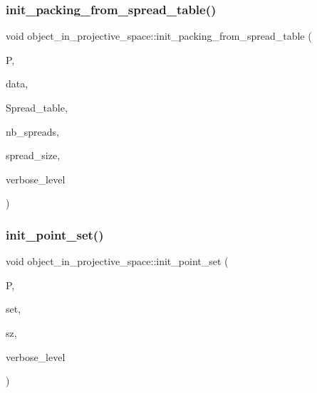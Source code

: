 \subsubsection{\texorpdfstring{init\+\_\+packing\+\_\+from\+\_\+spread\+\_\+table()}{init\_packing\_from\_spread\_table()}}
{\footnotesize\ttfamily void object\+\_\+in\+\_\+projective\+\_\+space\+::init\+\_\+packing\+\_\+from\+\_\+spread\+\_\+table (\begin{DoxyParamCaption}\item[{\mbox{\hyperlink{classprojective__space}{projective\+\_\+space}} $\ast$}]{P,  }\item[{\mbox{\hyperlink{galois_8h_a09fddde158a3a20bd2dcadb609de11dc}{I\+NT}} $\ast$}]{data,  }\item[{\mbox{\hyperlink{galois_8h_a09fddde158a3a20bd2dcadb609de11dc}{I\+NT}} $\ast$}]{Spread\+\_\+table,  }\item[{\mbox{\hyperlink{galois_8h_a09fddde158a3a20bd2dcadb609de11dc}{I\+NT}}}]{nb\+\_\+spreads,  }\item[{\mbox{\hyperlink{galois_8h_a09fddde158a3a20bd2dcadb609de11dc}{I\+NT}}}]{spread\+\_\+size,  }\item[{\mbox{\hyperlink{galois_8h_a09fddde158a3a20bd2dcadb609de11dc}{I\+NT}}}]{verbose\+\_\+level }\end{DoxyParamCaption})}

\mbox{\label{classobject__in__projective__space_ae06b87acb715d13efec5f6dcea0908ca}} 
\subsubsection{\texorpdfstring{init\+\_\+point\+\_\+set()}{init\_point\_set()}}
{\footnotesize\ttfamily void object\+\_\+in\+\_\+projective\+\_\+space\+::init\+\_\+point\+\_\+set (\begin{DoxyParamCaption}\item[{\mbox{\hyperlink{classprojective__space}{projective\+\_\+space}} $\ast$}]{P,  }\item[{\mbox{\hyperlink{galois_8h_a09fddde158a3a20bd2dcadb609de11dc}{I\+NT}} $\ast$}]{set,  }\item[{\mbox{\hyperlink{galois_8h_a09fddde158a3a20bd2dcadb609de11dc}{I\+NT}}}]{sz,  }\item[{\mbox{\hyperlink{galois_8h_a09fddde158a3a20bd2dcadb609de11dc}{I\+NT}}}]{verbose\+\_\+level }\end{DoxyParamCaption})}

